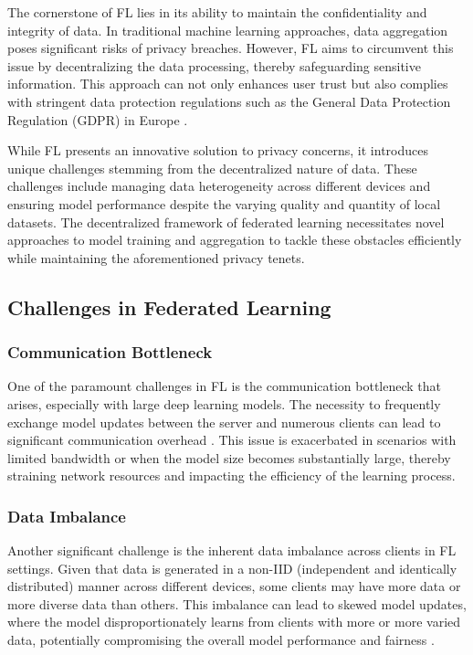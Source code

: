 \documentclass{article}
\begin{document}
The cornerstone of FL lies in its ability to maintain the confidentiality and integrity of data. In traditional machine learning approaches, data aggregation poses significant risks of privacy breaches. However, FL aims to circumvent this issue by decentralizing the data processing, thereby safeguarding sensitive information. This approach can not only enhances user trust but also complies with stringent data protection regulations such as the General Data Protection Regulation (GDPR)\cite{team2020eu} in Europe .\par

While FL presents an innovative solution to privacy concerns, it introduces unique challenges stemming from the decentralized nature of data. These challenges include managing data heterogeneity across different devices and ensuring model performance despite the varying quality and quantity of local datasets. The decentralized framework of federated learning necessitates novel approaches to model training and aggregation to tackle these obstacles efficiently while maintaining the aforementioned privacy tenets.\par

\subsection{Challenges in Federated Learning}

\subsubsection{Communication Bottleneck}
One of the paramount challenges in FL is the communication bottleneck that arises, especially with large deep learning models. The necessity to frequently exchange model updates between the server and numerous clients can lead to significant communication overhead \cite{nader2020adaptive}. This issue is exacerbated in scenarios with limited bandwidth or when the model size becomes substantially large, thereby straining network resources and impacting the efficiency of the learning process.\par

\subsubsection{Data Imbalance}
Another significant challenge is the inherent data imbalance across clients in FL settings. Given that data is generated in a non-IID (independent and identically distributed) manner across different devices, some clients may have more data or more diverse data than others. This imbalance can lead to skewed model updates, where the model disproportionately learns from clients with more or more varied data, potentially compromising the overall model performance and fairness \cite{10.1093/comjnl/bxac118, jeon2024federated}.\par
\end{document}
